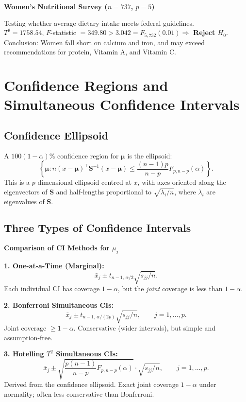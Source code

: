 \documentclass[12pt, a4paper]{article}
\newcommand{\xbar}{\bar{x}}
\newcommand{\muv}{\boldsymbol{\mu}}
\begin{document}
\begin{examplebox}\noindent\textbf{Women's Nutritional Survey ($n=737$, $p=5$)}\par\smallskip
Testing whether average dietary intake meets federal guidelines.\\
$T^2 = 1758.54$, $F$-statistic $= 349.80 > 3.042 = F_{5,732}(0.01) \Rightarrow$ \textbf{Reject $H_0$}.\\
Conclusion: Women fall short on calcium and iron, and may exceed recommendations for protein, Vitamin A, and Vitamin C.
\end{examplebox}

\section{Confidence Regions and Simultaneous Confidence Intervals}

\subsection{Confidence Ellipsoid}

A $100(1-\alpha)\%$ confidence region for $\muv$ is the ellipsoid:
\[
  \left\{\muv : n(\xbar-\muv)^{\top}\mathbf{S}^{-1}(\xbar-\muv) \leq \frac{(n-1)p}{n-p}F_{p,n-p}(\alpha)\right\}.
\]
This is a $p$-dimensional ellipsoid centred at $\xbar$, with axes oriented along the eigenvectors of $\mathbf{S}$ and half-lengths proportional to $\sqrt{\lambda_i/n}$, where $\lambda_i$ are eigenvalues of $\mathbf{S}$.

\subsection{Three Types of Confidence Intervals}

\begin{keybox}\noindent\textbf{Comparison of CI Methods for $\mu_j$}\par\smallskip

\textbf{1. One-at-a-Time (Marginal):}
\[
  \xbar_j \pm t_{n-1,\,\alpha/2}\sqrt{s_{jj}/n}.
\]
Each individual CI has coverage $1-\alpha$, but the \emph{joint} coverage is less than $1-\alpha$.

\medskip
\textbf{2. Bonferroni Simultaneous CIs:}
\[
  \xbar_j \pm t_{n-1,\,\alpha/(2p)}\sqrt{s_{jj}/n}, \qquad j=1,\ldots,p.
\]
Joint coverage $\geq 1-\alpha$. Conservative (wider intervals), but simple and assumption-free.

\medskip
\textbf{3. Hotelling $T^2$ Simultaneous CIs:}
\[
  \xbar_j \pm \sqrt{\frac{p(n-1)}{n-p}F_{p,n-p}(\alpha)}\cdot\sqrt{s_{jj}/n}, \qquad j=1,\ldots,p.
\]
Derived from the confidence ellipsoid. Exact joint coverage $1-\alpha$ under normality; often less conservative than Bonferroni.
\end{keybox}
\end{document}
